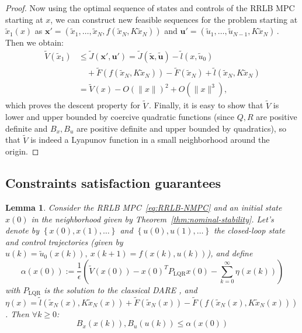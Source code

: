 \documentclass[conference]{IEEEtran}
\newtheorem{lemma}[theorem]{Lemma}
\theoremstyle{definition}
\theoremstyle{remark}
\def\rm#1{\mathrm{#1}}
\def\bf#1{\mathbf{#1}}
\begin{document}
\begin{proof}
	Now using the optimal sequence of states and controls of the RRLB MPC starting at $x$, we can construct new feasible sequences for the problem starting at $\tilde{x}_1(x)$ as
	$\bf{x}'=(\tilde{x}_1,\ldots,\tilde{x}_N,f(\tilde{x}_N,K\tilde{x}_N))$ and $\bf{u}'=(\tilde{u}_1,\ldots,\tilde{u}_{N-1},K\tilde{x}_N)$\,.
	Then we obtain:
	\begin{align*}
		\tilde{V}(\tilde{x}_1)&\leq\tilde{J}(\bf{x}',\bf{u}')=\tilde{J}(\tilde{\bf{x}},\tilde{\bf{u}})-\tilde{l}(x,\tilde{u}_0)\\
		&\quad+\tilde{F}(f(\tilde{x}_N,K\tilde{x}_N))-\tilde{F}(\tilde{x}_N)+\tilde{l}(\tilde{x}_N,K\tilde{x}_N)\\
		&=\tilde{V}(x)-O(\|x\|)^2+O(\|x\|^3),
	\end{align*}
	which proves the descent property for $\tilde{V}$\,.
	Finally, it is easy to show that $\tilde{V}$ is lower and upper bounded by coercive quadratic functions (since $Q,R$ are positive definite and $B_x,B_u$ are positive definite and upper bounded by quadratics), so that $\tilde{V}$ is indeed a Lyapunov function in a small neighborhood around the origin.
\end{proof}

\subsection{Constraints satisfaction guarantees}
\label{sec:constraints-satisfaction-guarantees}
\begin{lemma}
	\label{thm:RRLB-bounds-guarantees}
	Consider the RRLB MPC~\eqref{eq:RRLB-NMPC} and an initial state $x(0)$ in the neighborhood given by Theorem~\ref{thm:nominal-stability}.
	Let's denote by $\left\{x(0),x(1),\ldots\right\}$ and $\left\{u(0), u(1),\ldots\right\}$ the closed-loop state and control trajectories (given by $u(k)=\tilde{u}_0(x(k)),~x(k+1)=f(x(k),u(k))$), and define 
	\begin{equation*}	
		\alpha(x(0)):=\frac{1}{\epsilon}\left(\tilde{V}(x(0))-x(0)^TP_{\rm{LQR}}x(0)-\sum_{k=0}^\infty\eta(x(k))\right)
	\end{equation*}
	with $P_{\rm{LQR}}$ is the solution to the classical DARE
	, and $\eta(x)=\tilde{l}(\tilde{x}_N(x),K\tilde{x}_N(x))+\tilde{F}(\tilde{x}_N(x))-\tilde{F}(f(\tilde{x}_N(x), K\tilde{x}_N(x)))$.
	Then $\forall k\geq 0$:
	\begin{equation*}
		B_x(x(k)),B_u(u(k))\leq\alpha(x(0))
	\end{equation*}
\end{lemma}
\end{document}
